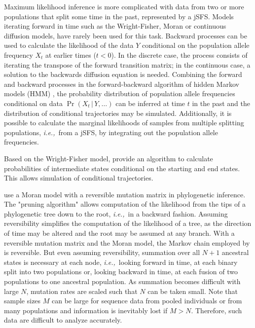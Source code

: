 \documentclass[preprint]{elsarticle}
\newcommand\given{{\,|\,}}
\newcommand\ie{{\it i.e.,}}
\begin{document}
Maximum likelihood inference is more complicated with data from two or more populations that split some time in the past, represented by a jSFS. Models iterating forward in time such as the Wright-Fisher, Moran or continuous diffusion models, have rarely been used for this task. Backward processes can be used to calculate the likelihood of the data $Y$ conditional on the population allele frequency $X_t$  at earlier times ($t<0$). In the discrete case, the process consists of iterating the transpose of the forward transition matrix; in the continuous case, a solution to the backwards diffusion equation is needed. Combining the forward and backward processes in the forward-backward algorithm of hidden Markov models (HMM) \citep{Rabi86}, the probability distribution of population allele frequencies conditional on data $\Pr(X_t\given Y,\dots)$ can be inferred at time $t$ in the past and the distribution of conditional trajectories may be simulated. Additionally, it is possible to calculate the marginal likelihoods of samples from multiple splitting populations, \ie\ from a jSFS, by integrating out the population allele frequencies.

Based on the Wright-Fisher model, \citet{Zhao14} provide an algorithm to calculate probabilities of intermediate states conditional on the starting and end states. This allows simulation of conditional trajectories. 

\citet{Schrempf2016} use a Moran model with a reversible mutation matrix in phylogenetic inference. The "pruning algorithm" \citep{Fels81} allows computation of the likelihood from the tips of a phylogenetic tree down to the root, \ie\ in a backward fashion. Assuming reversibility simplifies the computation of the likelihood of a tree, as the direction of time may be altered and the root may be assumed at any branch. With a reversible mutation matrix and the Moran model, the Markov chain employed by \citet{Schrempf2016} is reversible. But even assuming reversibility, summation over all $N+1$ ancestral states is necessary at each node, \ie\ looking forward in time, at each binary split into two populations or, looking backward in time, at each fusion of two populations to one ancestral population. As summation becomes difficult with large $N$, mutation rates are scaled such that $N$ can be taken small. Note that sample sizes $M$ can be large for sequence data from pooled individuals or from many populations and information is inevitably lost if $M>N$. Therefore, such data are  difficult to analyze accurately. 
\end{document}
